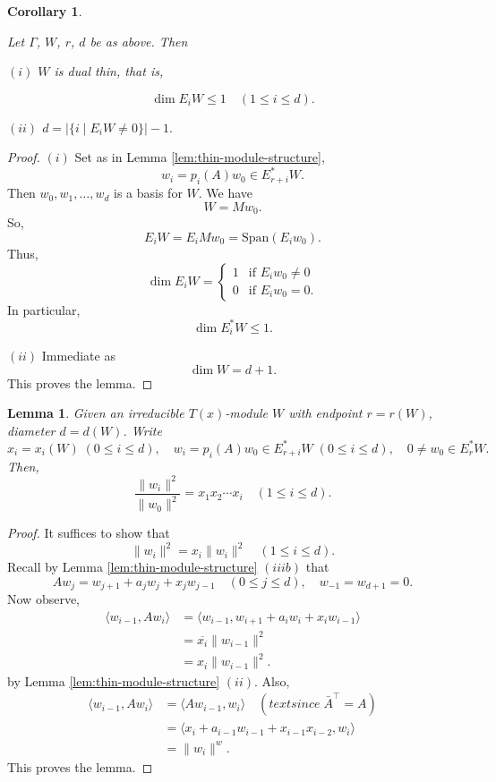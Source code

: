 \documentclass[
]{book}
\newtheorem{lemma}{Lemma}[chapter]
\newtheorem{corollary}{Corollary}[chapter]
\theoremstyle{definition}
\theoremstyle{definition}
\theoremstyle{definition}
\theoremstyle{definition}
\theoremstyle{remark}
\begin{document}
\begin{corollary}
\protect\hypertarget{cor:thin-is-dualthin}{}\label{cor:thin-is-dualthin}

Let \(\Gamma\), \(W\), \(r\), \(d\) be as above. Then

\((i)\) \(W\) is dual thin, that is,

\[\dim E_iW \leq 1 \quad (1\leq i \leq d).\]

\((ii)\) \(d = |\{i \mid E_iW \neq 0\}| - 1.\)

\end{corollary}

\begin{proof}
\((i)\) Set as in Lemma \ref{lem:thin-module-structure},
\[w_i = p_i(A)w_0\in E^*_{r+i}W.\]
Then \(w_0, w_1, \ldots, w_d\) is a basis for \(W\). We have
\[W = Mw_0.\]
So,
\[E_iW = E_iMw_0 = \mathrm{Span}(E_iw_0).\]
Thus,
\[\dim E_iW = \begin{cases}1 & \text{if } E_iw_0\neq 0\\ 0 & \text{if }E_iw_0 = 0.\end{cases}\]
In particular,
\[\dim E^*_iW \leq 1.\]

\((ii)\) Immediate as
\[\dim W = d+1.\]
This proves the lemma.
\end{proof}

\begin{lemma}
\protect\hypertarget{lem:measure-wi}{}\label{lem:measure-wi}Given an irreducible \(T(x)\)-module \(W\) with endpoint \(r = r(W)\), diameter \(d = d(W)\). Write
\[x_i = x_i(W) \; (0\leq i\leq d), \quad w_i = p_i(A)w_0\in E^*_{r+i}W \; (0\leq i\leq d), \quad 0\neq w_0 \in E^*_rW.\]
Then,
\[\frac{\|w_i\|^2}{\|w_0\|^2} = x_1x_2\cdots x_i \quad (1\leq i\leq d).\]
\end{lemma}

\begin{proof}
It suffices to show that
\[\|w_i\|^2 = x_i\|w_i\|^2 \quad (1\leq i\leq d).\]
Recall by Lemma \ref{lem:thin-module-structure} \((iiib)\) that
\[Aw_j = w_{j+1} + a_jw_j + x_jw_{j-1} \quad (0\leq j\leq d), \quad w_{-1} = w_{d+1} = 0.\]
Now observe,
\begin{align}
\langle w_{i-1}, Aw_i\rangle & = \langle w_{i-1}, w_{i+1}+ a_iw_i + x_iw_{i-1}\rangle\\
& = \overline{x_i}\|w_{i-1}\|^2\\
& = x_i\|w_{i-1}\|^2.
\end{align}
by Lemma \ref{lem:thin-module-structure} \((ii)\).
Also,
\begin{align}
\langle w_{i-1}, Aw_i\rangle & = \langle Aw_{i-1}, w_i\rangle \quad (text{since}\; \bar{A}^\top = A)\\
& = \langle x_i + a_{i-1}w_{i-1} + x_{i-1}x_{i-2}, w_i\rangle\\
& = \|w_i\|^w.
\end{align}
This proves the lemma.
\end{proof}
\end{document}
